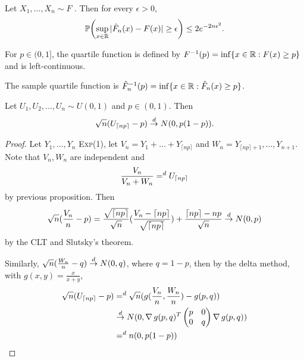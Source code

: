 \begin{thm}
  \label{defn:Introduction:1}
  Let $X_{1}, \dots, X_{n} \sim F$ \iid.  Then for every $\epsilon >
  0$,
  \begin{align}
    \label{eq:7}
    \Prob{\sup_{x \in \R}|\hat F_{n}(x) - F(x)| \geq \epsilon} \leq 2 e^{-2n\epsilon^{2}}.
  \end{align}
\end{thm}

\begin{defn}
  \label{sec:let-x_1-dots}
  For $p \in (0, 1]$, the quartile function is defined by $F^{-1}(p) =
  \inf \{x \in \mathbb{R}: F(x) \geq p \}$ and is left-continuous.

  The sample quartile function is $\hat F_{n}^{-1}(p) = \inf \{ x \in
  \mathbb{R}: \hat F_{n}(x) \geq p \} $. 
\end{defn}

\begin{thm}
  Let $U_{1}, U_{2}, \dots, U_{n} \sim U(0, 1)$ \iid and $p \in (0,
  1)$.  Then
  \begin{equation}
    \label{eq:135}
    \sqrt{n}(U_{\lceil np \rceil} - p) \overset{d}{\rightarrow} N(0, p(1-p)).
  \end{equation}
\end{thm}

\begin{proof}
  Let $Y_{1}, \dots, Y_{n}$ \iid \textsc{Exp}(1), let $V_{n} = Y_{1} + \dots +
  Y_{\lceil np \rceil}$ and $W_{n} = Y_{\lceil np \rceil + 1}, \dots,
  Y_{n+1}$.  Note that $V_{n}, W_{n}$ are independent and
  \begin{equation}
    \label{eq:136}
    \frac{V_{n}}{V_{n} + W_{n}} =^{d} U_{\upperbound{np}}
  \end{equation} by previous proposition.
  Then
  \begin{align}
    \label{eq:137}
    \sqrt{n}(\frac{V_{n}}{n} - p) =
    \frac{\sqrt{\upperbound{np}}}{\sqrt{n}} (\frac{V_{n} -
      \upperbound{np}}{\sqrt{\upperbound{np}}} ) +
    \frac{\upperbound{np} - np}{\sqrt{n}} \cd N(0, p)
  \end{align} by the CLT and Slutsky's theorem.

  Similarly, $\sqrt{n}(\frac{W_{n}}{n} - q) \overset{d}{\rightarrow} N(0, q)$, where $q = 1
  - p$, then by the delta method, with $g(x, y) = \frac{x}{x+y}$,
  \begin{align}
    \label{eq:138}
    \sqrt{n}(U_{\upperbound{np}} - p) &=^{d}
    \sqrt{n}(g(\frac{V_{n}}{n}, \frac{W_{n}}{n}) - g(p, q)) \\
    &\cd N(0, \grad g(p, q)^{T}
    \begin{pmatrix}
      p & 0 \\
      0 & q
    \end{pmatrix} \grad g(p, q)) \\
    \label{eq:140}
    &=^{d} n(0, p(1-p))
  \end{align}
\end{proof}

